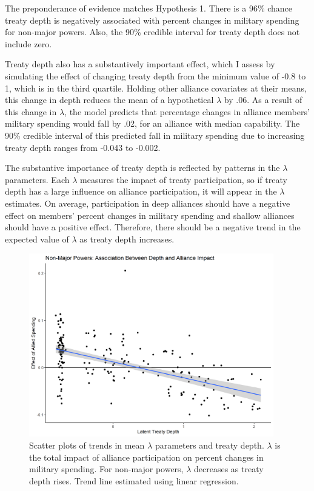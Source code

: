 \documentclass[12pt]{article}
\begin{document}
The preponderance of evidence matches Hypothesis 1. 
There is a 96\% chance treaty depth is negatively associated with percent changes in military spending for non-major powers.
Also, the 90\% credible interval for treaty depth does not include zero. 


Treaty depth also has a substantively important effect, which I assess by simulating the effect of changing treaty depth from the minimum value of -0.8 to 1, which is in the third quartile. 
Holding other alliance covariates at their means, this change in depth reduces the mean of a hypothetical $\lambda$ by .06.
As a result of this change in $\lambda$, the model predicts that percentage changes in alliance members' military spending would fall by .02, for an alliance with median capability. 
The 90\% credible interval of this predicted fall in military spending due to increasing treaty depth ranges from -0.043 to -0.002. 


The substantive importance of treaty depth is reflected by patterns in the $\lambda$ parameters. 
Each $\lambda$ measures the impact of treaty participation, so if treaty depth has a large influence on alliance participation, it will appear in the $\lambda$ estimates. 
On average, participation in deep alliances should have a negative effect on members' percent changes in military spending and shallow alliances should have a positive effect.
Therefore, there should be a negative trend in the expected value of $\lambda$ as treaty depth increases.


\begin{figure}[htbp]
	\centering
		\includegraphics[width=0.95\textwidth]{../figures/lambda-ld-nonmaj.png}
	\caption{Scatter plots of trends in mean $\lambda$ parameters and treaty depth. $\lambda$ is the total impact of alliance participation on percent changes in military spending. For non-major powers, $\lambda$ decreases as treaty depth rises. Trend line estimated using linear regression.}
	\label{fig:lambda-ld-nonmaj}
\end{figure}
\end{document}
